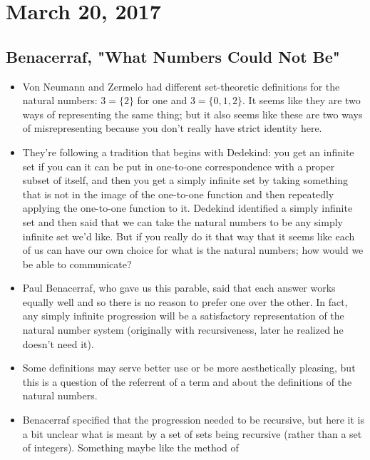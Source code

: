 \documentclass[12pt]{article}
\theoremstyle{definition}
\begin{document}
\section{March 20, 2017}

\subsection{Benacerraf, "What Numbers Could Not Be"}

\begin{itemize}
    \itemsep0em 
    \item 
        Von Neumann and Zermelo had different set-theoretic definitions for the
        natural numbers: $3 = \{2\}$ for one and $3 = \{0,1,2\}$. It seems like
        they are two ways of representing the same thing; but it also seems
        like these are two ways of misrepresenting because you don't really
        have strict identity here.
    \item
        They're following a tradition that begins with Dedekind: you get an
        infinite set if you can it can be put in one-to-one correspondence with
        a proper subset of itself, and then you get a simply infinite set by
        taking something that is not in the image of the one-to-one function
        and then repeatedly applying the one-to-one function to it. Dedekind
        identified a simply infinite set and then said that we can take the
        natural numbers to be any simply infinite set we'd like. But if you
        really do it that way that it seems like each of us can have our own
        choice for what is the natural numbers; how would we be able to
        communicate? 
    \item
        Paul Benacerraf, who gave us this parable, said that each answer works
        equally well and so there is no reason to prefer one over the other. In
        fact, any simply infinite progression will be a satisfactory
        representation of the natural number system (originally with
        recursiveness, later he realized he doesn't need it). 
    \item
        Some definitions may serve better use or be more aesthetically
        pleasing, but this is a question of the referrent of a term and about
        the definitions of the natural numbers.
    \item
        Benacerraf specified that the progression needed to be recursive, but
        here it is a bit unclear what is meant by a set of sets being recursive
        (rather than a set of integers). Something maybe like the method of

\end{itemize}
\end{document}
